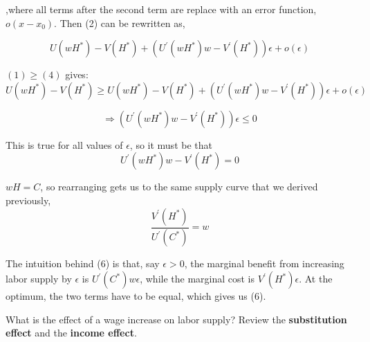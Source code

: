 \documentclass[12pt]{article}
\begin{document}
,where all terms after the second term are replace with an error function, $o(x-x_{0})$. Then (2) can be rewritten as, 

\begin{equation*}\tag{4}
U({wH}^*) - V ({H}^*) + (U^{\prime}({wH}^*)w - V^{\prime} ({H}^*))\epsilon + o(\epsilon)
\end{equation*}%

$(1) \ge (4)$ gives:
\begin{equation*}
U({wH}^*) - V ({H}^*) \ge U({wH}^*) - V ({H}^*) + (U^{\prime}({wH}^*)w - V^{\prime} ({H}^*))\epsilon + o(\epsilon)
\end{equation*}%

\begin{equation*}
\Rightarrow (U^{\prime}({wH}^*)w - V^{\prime} ({H}^*))\epsilon \leq 0
\end{equation*}%

This is true for all values of $\epsilon$, so it must be that 
\begin{equation*}\tag{5}
U^{\prime}({wH}^*)w - V^{\prime} ({H}^*) = 0 
\end{equation*}%

${wH} = C$, so rearranging gets us to the same supply curve that we  derived previously, 
\begin{equation*}\tag{6}
\frac{V^{\prime} ({H}^*)}{U^{\prime}({C}^*)} = w
\end{equation*}

The intuition behind (6) is that, say $\epsilon>0$, the marginal benefit from increasing labor supply by $\epsilon$ is $U^{\prime}({C}^*)w\epsilon$, while the marginal cost is $V^{\prime} ({H}^*)\epsilon$. At the optimum, the two terms have to be equal, which gives us (6). 

\vspace{5mm}

What is the effect of a wage increase on labor supply? 
Review the {\bf substitution effect} and the {\bf income effect}. 
\end{document}

